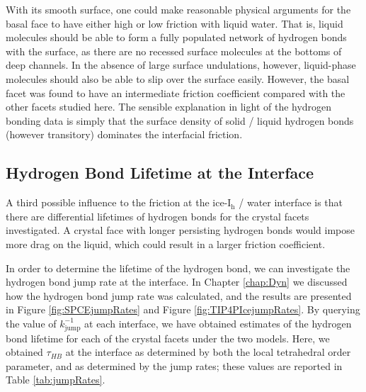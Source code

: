 With its smooth surface, one could make reasonable physical arguments
for the basal face to have either high or low friction with liquid
water. That is, liquid molecules should be able to form a fully
populated network of hydrogen bonds with the surface, as there are no
recessed surface molecules at the bottoms of deep channels. In the
absence of large surface undulations, however, liquid-phase molecules
should also be able to slip over the surface easily. However, the
basal facet was found to have an intermediate friction coefficient
compared with the other facets studied here. The sensible explanation
in light of the hydrogen bonding data is simply that the surface
density of solid / liquid hydrogen bonds (however transitory)
dominates the interfacial friction.

\subsection{Hydrogen Bond Lifetime at the Interface}
A third possible influence to the friction at the ice-I$_\mathrm{h}$ /
water interface is that there are differential lifetimes of hydrogen
bonds for the crystal facets investigated. A crystal face with longer
persisting hydrogen bonds would impose more drag on the liquid, which
could result in a larger friction coefficient. 

In order to determine the lifetime of the hydrogen bond, we can
investigate the hydrogen bond jump rate at the interface. In Chapter
\ref{chap:Dyn} we discussed how the hydrogen bond jump rate was
calculated, and the results are presented in Figure
\ref{fig:SPCEjumpRates} and Figure \ref{fig:TIP4PIcejumpRates}. By
querying the value of $k_\mathrm{jump}^{-1}$ at each interface, we
have obtained estimates of the hydrogen bond lifetime for each of the
crystal facets under the two models. Here, we obtained $\tau_{HB}$ at
the interface as determined by both the local tetrahedral order
parameter, and as determined by the jump rates; these values are
reported in Table \ref{tab:jumpRates}.


